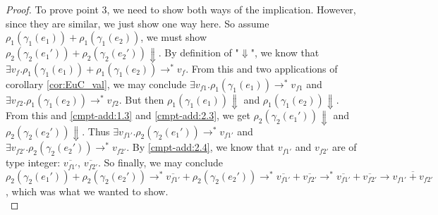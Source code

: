 \documentclass[twoside,11pt,openright]{report}
\theoremstyle{definition}
\newcommand{\expr}{e}
\newcommand{\val}{v}
\newcommand{\Num}[1]{\overline{#1}}
\newcommand{\step}{\rightarrow}
\newcommand{\stepS}{\rightarrow^*}
\begin{document}
\begin{proof}
  To prove point 3, we need to show both ways of the implication. However, since they are similar, we just show one way here. So assume $\rho_1(\gamma_1(\expr_1)) + \rho_1(\gamma_1(\expr_2))$, we must show $\rho_2(\gamma_2(\expr_1')) + \rho_2(\gamma_2(\expr_2')) \Downarrow$. By definition of "$\Downarrow$", we know that $\exists \val_f . \rho_1(\gamma_1(\expr_1)) + \rho_1(\gamma_1(\expr_2)) \stepS \val_f$. From this and two applications of corollary \ref{cor:EuC_val}, we may conclude $\exists \val_{f1} . \rho_1(\gamma_1(\expr_1)) \stepS \val_{f1}$ and $\exists \val_{f2} . \rho_1(\gamma_1(\expr_2)) \stepS \val_{f2}$. But then $\rho_1(\gamma_1(\expr_1)) \Downarrow$ and $\rho_1(\gamma_1(\expr_2)) \Downarrow$. From this and \ref*{cmpt-add:1.3} and \ref*{cmpt-add:2.3}, we get $\rho_2(\gamma_2(\expr_1')) \Downarrow$ and $\rho_2(\gamma_2(\expr_2')) \Downarrow$. Thus $\exists \val_{f1'} . \rho_2(\gamma_2(\expr_1')) \stepS \val_{f1'}$ and $\exists \val_{f2'} . \rho_2(\gamma_2(\expr_2')) \stepS \val_{f2'}$. By \ref*{cmpt-add:2.4}, we know that $\val_{f1'}$ and $\val_{f2'}$ are of type integer: $\Num{\val_{f1'}}$, $\Num{\val_{f2'}}$. So finally, we may conclude $\rho_2(\gamma_2(\expr_1')) + \rho_2(\gamma_2(\expr_2')) \stepS \Num{\val_{f1'}} + \rho_2(\gamma_2(\expr_2')) \stepS \Num{\val_{f1'}} + \Num{\val_{f2'}} \stepS \Num{\val_{f1'}} + \Num{\val_{f2'}} \step \Num{\val_{f1'} + \val_{f2'}}$, which was what we wanted to show.\\

\end{proof}
\end{document}
